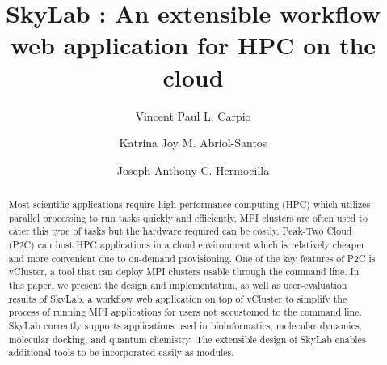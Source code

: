 \documentclass[sigconf]{acmart}
\begin{document}
\title{SkyLab : An extensible workflow web application for HPC on the cloud}

\author{Vincent Paul L. Carpio}

\author{Katrina Joy M. Abriol-Santos}

\author{Joseph Anthony C. Hermocilla}



\renewcommand{\shortauthors}{V. P. Carpio et. al.}


\begin{abstract}
Most scientific applications require high performance computing (HPC) which utilizes parallel processing to run tasks quickly and efficiently. MPI clusters are often used to cater this type of tasks but the hardware required can be costly. Peak-Two Cloud (P2C) can host HPC applications in a cloud environment which is relatively cheaper and more convenient due to on-demand provisioning. One of the key features of P2C is vCluster, a tool that can deploy MPI clusters usable through the command line. In this paper, we present the design and implementation, as well as user-evaluation results of SkyLab, a workflow web application on top of vCluster to simplify the process of running MPI applications for users not accustomed to the command line. SkyLab currently supports applications used in bioinformatics, molecular dynamics, molecular docking, and quantum chemistry. The extensible design of SkyLab enables additional tools to be incorporated easily as modules. 
\end{abstract}
\end{document}
